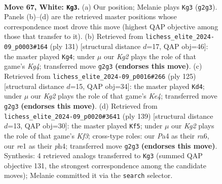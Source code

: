 \documentclass[11pt]{article}
\begin{document}
\clearpage

\begin{figure}[p]\centering
\begin{subfigure}{0.46\textwidth}\centering
\resizebox{\linewidth}{!}{%
\newchessgame
\chessboard[
  setfen={1R6/R4pk1/4p3/8/P3P3/5P2/6K1/4r3 w - - 25 67},
  showmover=false,
  pgfstyle=straightmove, color=movearrow, markmove={g2-g3}
]}
\caption{}
\end{subfigure}\hfill
\begin{subfigure}{0.46\textwidth}\centering
\resizebox{\linewidth}{!}{%
\newchessgame
\chessboard[
  setfen={8/8/4R3/5pk1/4p3/6P1/1r3PK1/8 b - - 30 66},
  showmover=false,
  pgfstyle=straightmove, color=movearrow, markmove={g5-g4}
]}
\caption{}
\end{subfigure}
\\[4pt]
\begin{subfigure}{0.46\textwidth}\centering
\resizebox{\linewidth}{!}{%
\newchessgame
\chessboard[
  setfen={6K1/6P1/R7/2p1k3/2P5/4p1r1/3p4/8 b - - 2 63},
  showmover=false,
  pgfstyle=straightmove, color=movearrow, markmove={e5-d4}
]}
\caption{}
\end{subfigure}\hfill
\begin{subfigure}{0.46\textwidth}\centering
\resizebox{\linewidth}{!}{%
\newchessgame
\chessboard[
  setfen={8/8/R4kp1/7p/7P/5P2/1r4PK/8 b - - 37 70},
  showmover=false,
  pgfstyle=straightmove, color=movearrow, markmove={f6-f5}
]}
\caption{}
\end{subfigure}
\caption{\textbf{Move 67, White: \texttt{Kg3}.} (a) Our position; Melanie plays \texttt{Kg3} (\texttt{g2g3}). Panels (b)--(d) are the retrieved master positions whose correspondence most drove this move (highest QAP objective among those that transfer to it). (b) Retrieved from \texttt{lichess\_elite\_2024-09\_p0003\#164} (ply 131) [structural distance $d$=17, QAP obj=46]: the master played \texttt{Kg4}; under $\mu$ our \emph{Kg2} plays the role of that game's \emph{Kg4}; transferred move \texttt{g2g3} \textbf{(endorses this move)}. (c) Retrieved from \texttt{lichess\_elite\_2024-09\_p0016\#266} (ply 125) [structural distance $d$=15, QAP obj=34]: the master played \texttt{Kd4}; under $\mu$ our \emph{Kg2} plays the role of that game's \emph{Ke4}; transferred move \texttt{g2g3} \textbf{(endorses this move)}. (d) Retrieved from \texttt{lichess\_elite\_2024-09\_p0020\#3641} (ply 139) [structural distance $d$=13, QAP obj=30]: the master played \texttt{Kf5}; under $\mu$ our \emph{Kg2} plays the role of that game's \emph{Kf3}; cross-type roles: our \emph{P}a4 as their \emph{r}a6, our \emph{r}e1 as their \emph{p}h4; transferred move \texttt{g2g3} \textbf{(endorses this move)}. Synthesis: 4 retrieved analogs transferred to \texttt{Kg3} (summed QAP objective 131, the strongest correspondence among the candidate moves); Melanie committed it via the \texttt{search} selector.}
\label{fig:thought-m132}
\end{figure}
\end{document}
